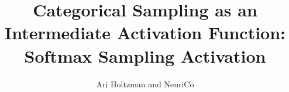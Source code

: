 \documentclass{article}
\title{Categorical Sampling as an Intermediate Activation Function: Softmax Sampling Activation}
\author{Ari Holtzman and NeuriCo}
\begin{document}
\maketitle

\begin{abstract}

\end{abstract}









\end{document}
